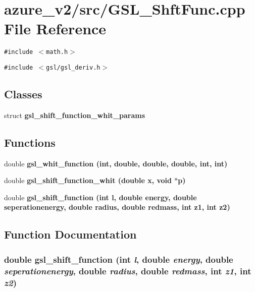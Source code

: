 \section{azure\_\-v2/src/GSL\_\-Shft\-Func.cpp File Reference}
\label{GSL__ShftFunc_8cpp}
{\tt \#include $<$math.h$>$}\par
{\tt \#include $<$gsl/gsl\_\-deriv.h$>$}\par
\subsection*{Classes}
\begin{CompactItemize}
\item 
struct \bf{gsl\_\-shift\_\-function\_\-whit\_\-params}
\end{CompactItemize}
\subsection*{Functions}
\begin{CompactItemize}
\item 
double \bf{gsl\_\-whit\_\-function} (int, double, double, double, int, int)
\item 
double \bf{gsl\_\-shift\_\-function\_\-whit} (double x, void $\ast$p)
\item 
double \bf{gsl\_\-shift\_\-function} (int l, double energy, double seperationenergy, double radius, double redmass, int z1, int z2)
\end{CompactItemize}


\subsection{Function Documentation}
\subsubsection{\setlength{\rightskip}{0pt plus 5cm}double gsl\_\-shift\_\-function (int {\em l}, double {\em energy}, double {\em seperationenergy}, double {\em radius}, double {\em redmass}, int {\em z1}, int {\em z2})}\label{GSL__ShftFunc_8cpp_1eabf2a0744f0ba179a0f085949115a8}


